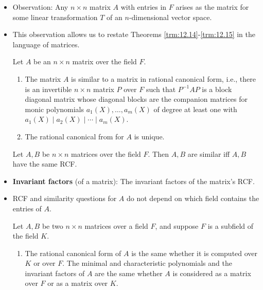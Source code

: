 \documentclass[../notes.tex]{subfiles}
\begin{document}
\begin{itemize}
\begin{theorem}
\begin{enumerate}
            \item $S$ and $T$ have the same rational canonical form.
        \end{enumerate}
        \begin{proof}
            Given.
        \end{proof}
    \end{theorem}
    \item Observation: Any $n\times n$ matrix $A$ with entries in $F$ arises as the matrix for some linear transformation $T$ of an $n$-dimensional vector space.
    \item This observation allows us to restate Theorems \ref{trm:12.14}-\ref{trm:12.15} in the language of matrices.
    \begin{theorem}\label{trm:12.16}
        Let $A$ be an $n\times n$ matrix over the field $F$.
        \begin{enumerate}
            \item The matrix $A$ is similar to a matrix in rational canonical form, i.e., there is an invertible $n\times n$ matrix $P$ over $F$ such that $P^{-1}AP$ is a block diagonal matrix whose diagonal blocks are the companion matrices for monic polynomials $a_1(X),\dots,a_m(X)$ of degree at least one with $a_1(X)\mid a_2(X)\mid\cdots\mid a_m(X)$.
            \item The rational canonical from for $A$ is unique.
        \end{enumerate}
    \end{theorem}
    \begin{theorem}\label{trm:12.17}
        Let $A,B$ be $n\times n$ matrices over the field $F$. Then $A,B$ are similar iff $A,B$ have the same RCF.
    \end{theorem}
    \item \textbf{Invariant factors} (of a matrix): The invariant factors of the matrix's RCF.
    \item RCF and similarity questions for $A$ do not depend on which field contains the entries of $A$.
    \begin{corollary}\label{cly:12.18}
        Let $A,B$ be two $n\times n$ matrices over a field $F$, and suppose $F$ is a subfield of the field $K$.
        \begin{enumerate}
            \item The rational canonical form of $A$ is the same whether it is computed over $K$ or over $F$. The minimal and characteristic polynomials and the invariant factors of $A$ are the same whether $A$ is considered as a matrix over $F$ or as a matrix over $K$.

\end{enumerate}
\end{corollary}
\end{itemize}
\end{document}
